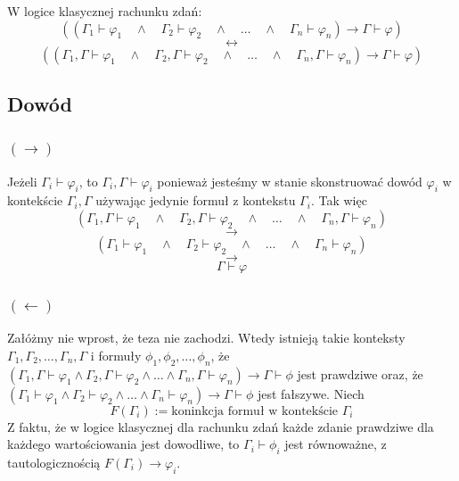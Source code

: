 \documentclass{article}
\begin{document}
\begin{center}
\begin{tcolorbox}[
    colback=gray!5,
    colframe=black,
    fonttitle=\bfseries,
    title=Obserwacja 1
]
W logice klasycznej rachunku zdań:
\[
((\Gamma_1 \vdash \varphi_1 \quad \land \quad \Gamma_2 \vdash \varphi_2 \quad \land \quad \dots \quad \land  \quad\Gamma_n \vdash \varphi_n ) \rightarrow \Gamma \vdash \varphi) 
\]
\[
\leftrightarrow
\]
\[
((\Gamma_1, \Gamma \vdash \varphi_1 \quad \land \quad \Gamma_2, \Gamma \vdash \varphi_2 \quad \land \quad \dots \quad \land  \quad\Gamma_n, \Gamma \vdash \varphi_n ) \rightarrow \Gamma \vdash \varphi)
\] 
\subsection*{Dowód}
\subsubsection*{$(\rightarrow)$}
Jeżeli $\Gamma_i \vdash \varphi_i$, to $\Gamma_i , \Gamma \vdash \varphi_i$ ponieważ jesteśmy w stanie skonstruować dowód $\varphi_i$ w kontekście $\Gamma_i, \Gamma$ używając jedynie formuł z kontekstu
$\Gamma_i$. Tak więc  
\[
(\Gamma_1, \Gamma \vdash \varphi_1 \quad \land \quad \Gamma_2, \Gamma \vdash \varphi_2 \quad \land \quad \dots \quad \land  \quad\Gamma_n, \Gamma \vdash \varphi_n ) 
\] 
\[
\rightarrow
\]
\[
(\Gamma_1 \vdash \varphi_1 \quad \land \quad \Gamma_2 \vdash \varphi_2 \quad \land \quad \dots \quad \land  \quad\Gamma_n \vdash \varphi_n )
\]
\[
\rightarrow
\]
\[
\Gamma \vdash \varphi
\]


\subsubsection*{$(\leftarrow)$}
Załóżmy nie wprost, że teza nie zachodzi.
Wtedy istnieją takie konteksty $\Gamma_1,\Gamma_2,\dots,\Gamma_n,\Gamma$ i formuły $\phi_1,\phi_2,\dots,\phi_n$, że $(\Gamma_1, \Gamma \vdash \varphi_1  \land  \Gamma_2, \Gamma \vdash \varphi_2  \land  \dots  \land  \Gamma_n, \Gamma \vdash \varphi_n ) \rightarrow \Gamma \vdash \phi$ jest prawdziwe oraz, że $(\Gamma_1 \vdash \varphi_1  \land  \Gamma_2 \vdash \varphi_2  \land  \dots  \land  \Gamma_n \vdash \varphi_n ) \rightarrow \Gamma \vdash \phi$ jest fałszywe. Niech $$F(\Gamma_i) := \text{koninkcja formuł w kontekście $\Gamma_i$}$$
Z faktu, że w logice klasycznej dla rachunku zdań każde zdanie prawdziwe dla każdego wartościowania jest dowodliwe, to $\Gamma_i \vdash \phi_i$ jest równoważne, z tautologicznością $F({\Gamma_i}) \rightarrow \varphi_i$.


\end{tcolorbox}
\end{center}
\end{document}
